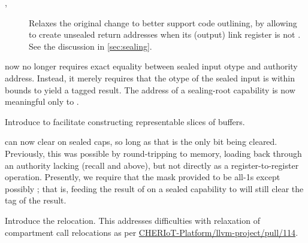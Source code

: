 \begin{description}
\begin{description}
      \begin{description}
        \item[, ] Relaxes the original change to better support code outlining,
          by allowing  to create unsealed return addresses
          when its (output) link register is not .
          See the discussion in \cref{sec:sealing}.
      \end{description}
    \item[\ghissue{71}, \ghpr{87}]  now no longer requires exact equality between sealed input otype and authority address.
      Instead, it merely requires that the otype of the sealed input is within bounds to yield a tagged result.
      The address of a sealing-root capability is now meaningful only to .
    \item[\ghissue{72},\ghpr{74}] Introduce  to facilitate constructing representable slices of buffers.
    \item[\ghissue{70},\ghpr{83}]  can now clear \cappermG on sealed caps, so long as that is the only bit being cleared.
      Previously, this was possible by round-tripping to memory, loading back through an authority lacking \cappermILG(recall  and  above), but not directly as a register-to-register operation.
      Presently, we require that the mask provided to  be all-1s except possibly \cappermG;
      that is, feeding the result of  on a sealed capability to  will still clear the tag of the result.
    \item[\ghpr{97}] Introduce the  relocation. This addresses difficulties with relaxation of compartment call relocations as per 
    \href{https://github.com/CHERIoT-Platform/llvm-project/pull/114}{CHERIoT-Platform/llvm-project/pull/114}.
  \end{description}
\end{description}
